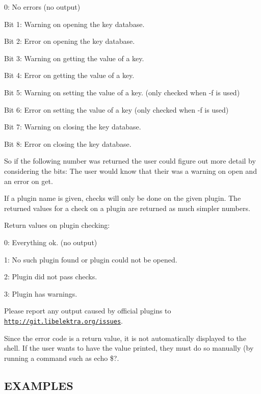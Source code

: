 \begin{DoxyItemize}
\item 0\+: No errors (no output)
\item Bit 1\+: Warning on opening the key database.
\item Bit 2\+: Error on opening the key database.
\item Bit 3\+: Warning on getting the value of a key.
\item Bit 4\+: Error on getting the value of a key.
\item Bit 5\+: Warning on setting the value of a key. (only checked when {\ttfamily -\/f} is used)
\item Bit 6\+: Error on setting the value of a key (only checked when {\ttfamily -\/f} is used)
\item Bit 7\+: Warning on closing the key database.
\item Bit 8\+: Error on closing the key database.
\end{DoxyItemize}

So if the following number was returned {} the user could figure out more detail by considering the bits\+: {} The user would know that their was a warning on open and an error on get.

If a plugin name is given, checks will only be done on the given plugin. The returned values for a check on a plugin are returned as much simpler numbers.

Return values on plugin checking\+:


\begin{DoxyItemize}
\item 0\+: Everything ok. (no output)
\item 1\+: No such plugin found or plugin could not be opened.
\item 2\+: Plugin did not pass checks.
\item 3\+: Plugin has warnings.
\end{DoxyItemize}

Please report any output caused by official plugins to \href{http://git.libelektra.org/issues}{\tt http\+://git.\+libelektra.\+org/issues}.

Since the error code is a return value, it is not automatically displayed to the shell. If the user wants to have the value printed, they must do so manually (by running a command such as {\ttfamily echo \$?}.

\subsection*{E\+X\+A\+M\+P\+L\+E\+S}

